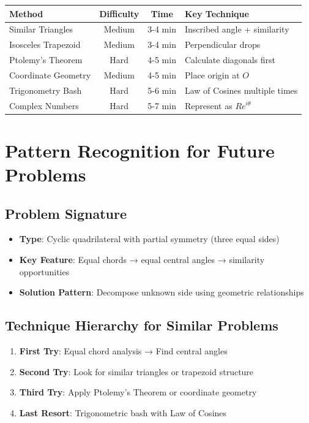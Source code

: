 \documentclass[12pt]{article}
\begin{document}
\begin{center}
\begin{tabular}{|l|c|c|l|}
\hline
\textbf{Method} & \textbf{Difficulty} & \textbf{Time} & \textbf{Key Technique} \\
\hline
Similar Triangles & Medium & 3-4 min & Inscribed angle + similarity \\
Isosceles Trapezoid & Medium & 3-4 min & Perpendicular drops \\
Ptolemy's Theorem & Hard & 4-5 min & Calculate diagonals first \\
Coordinate Geometry & Medium & 4-5 min & Place origin at $O$ \\
Trigonometry Bash & Hard & 5-6 min & Law of Cosines multiple times \\
Complex Numbers & Hard & 5-7 min & Represent as $Re^{i\theta}$ \\
\hline
\end{tabular}
\end{center}

\section*{Pattern Recognition for Future Problems}

\subsection*{Problem Signature}
\begin{itemize}[leftmargin=*]
    \item \textbf{Type}: Cyclic quadrilateral with partial symmetry (three equal sides)
    \item \textbf{Key Feature}: Equal chords → equal central angles → similarity opportunities
    \item \textbf{Solution Pattern}: Decompose unknown side using geometric relationships
\end{itemize}

\subsection*{Technique Hierarchy for Similar Problems}
\begin{enumerate}[leftmargin=*]
    \item \textbf{First Try}: Equal chord analysis → Find central angles
    \item \textbf{Second Try}: Look for similar triangles or trapezoid structure  
    \item \textbf{Third Try}: Apply Ptolemy's Theorem or coordinate geometry
    \item \textbf{Last Resort}: Trigonometric bash with Law of Cosines
\end{enumerate}
\end{document}
